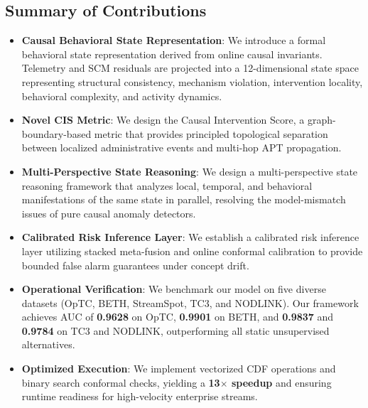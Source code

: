 \subsection{Summary of Contributions}
\begin{itemize}
\item \textbf{Causal Behavioral State Representation}: We introduce a formal behavioral state representation derived from online causal invariants. Telemetry and SCM residuals are projected into a 12-dimensional state space representing structural consistency, mechanism violation, intervention locality, behavioral complexity, and activity dynamics.
\item \textbf{Novel CIS Metric}: We design the Causal Intervention Score, a graph-boundary-based metric that provides principled topological separation between localized administrative events and multi-hop APT propagation.
\item \textbf{Multi-Perspective State Reasoning}: We design a multi-perspective state reasoning framework that analyzes local, temporal, and behavioral manifestations of the same state in parallel, resolving the model-mismatch issues of pure causal anomaly detectors.
\item \textbf{Calibrated Risk Inference Layer}: We establish a calibrated risk inference layer utilizing stacked meta-fusion and online conformal calibration to provide bounded false alarm guarantees under concept drift.
\item \textbf{Operational Verification}: We benchmark our model on five diverse datasets (OpTC, BETH, StreamSpot, TC3, and NODLINK). Our framework achieves AUC of \textbf{0.9628} on OpTC, \textbf{0.9901} on BETH, and \textbf{0.9837} and \textbf{0.9784} on TC3 and NODLINK, outperforming all static unsupervised alternatives.
\item \textbf{Optimized Execution}: We implement vectorized CDF operations and binary search conformal checks, yielding a \textbf{13$\times$ speedup} and ensuring runtime readiness for high-velocity enterprise streams.
\end{itemize}
